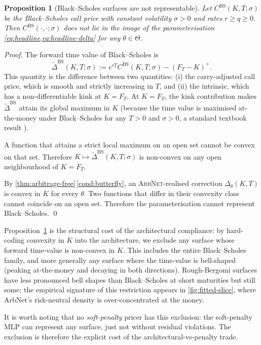 \documentclass[largeformat]{interact}
\let\cite\citep   %
\theoremstyle{plain}
\newtheorem{proposition}[theorem]{Proposition}
\theoremstyle{definition}
\newcommand{\eqdef}{:=}
\newcommand{\arbnet}{\textsc{ArbNet}}
\newcommand{\bs}{Black--Scholes}
\begin{document}
\begin{proposition}[\bs{} surfaces are not representable]
\label{prop:bs-excluded}
Let $C^{\mathrm{BS}}(K, T; \sigma)$ be the \bs{} call price with constant volatility $\sigma > 0$ and rates $r \geq q \geq 0$. Then $C^{\mathrm{BS}}(\cdot, \cdot; \sigma)$ does not lie in the image of the parameterisation \cref{eq:headline,eq:headline-delta} for any $\theta \in \Theta$.
\end{proposition}

\begin{proof}
The forward time value of \bs{} is
\[
\widetilde\Delta^{\mathrm{BS}}(K, T; \sigma) \eqdef e^{rT}C^{\mathrm{BS}}(K, T; \sigma) - (F_T - K)^+.
\]
This quantity is the difference between two quantities: (i) the carry-adjusted call price, which is smooth and strictly increasing in $T$, and (ii) the intrinsic, which has a non-differentiable kink at $K = F_T$. At $K = F_T$, the kink contribution makes $\widetilde\Delta^{\mathrm{BS}}$ attain its global maximum in $K$ (because the time value is maximised at-the-money under \bs{} for any $T > 0$ and $\sigma > 0$, a standard textbook result \cite{hull2018options}).

A function that attains a strict local maximum on an open set cannot be convex on that set. Therefore $K \mapsto \widetilde\Delta^{\mathrm{BS}}(K, T; \sigma)$ is non-convex on any open neighbourhood of $K = F_T$.

By \cref{thm:arbitrage-free}\,\ref{cond:butterfly}, an \arbnet{}-realised correction $\Delta_\theta(K, T)$ is convex in $K$ for every $\theta$. Two functions that differ in their convexity class cannot coincide on an open set. Therefore the parameterisation cannot represent \bs{}.
\qed
\end{proof}

Proposition~\ref{prop:bs-excluded} is the structural cost of the architectural compliance: by hard-coding convexity in $K$ into the architecture, we exclude any surface whose forward time-value is non-convex in $K$. This includes the entire \bs{} family, and more generally any surface where the time-value is bell-shaped (peaking at-the-money and decaying in both directions). Rough-Bergomi surfaces have less pronounced bell shapes than \bs{} at short maturities but still some; the empirical signature of this restriction appears in \cref{fig:fitted-slice}, where ArbNet's risk-neutral density is over-concentrated at the money.

It is worth noting that no \emph{soft-penalty} pricer has this exclusion: the soft-penalty MLP can represent any surface, just not without residual violations. The exclusion is therefore the explicit cost of the architectural-vs-penalty trade.
\end{document}
